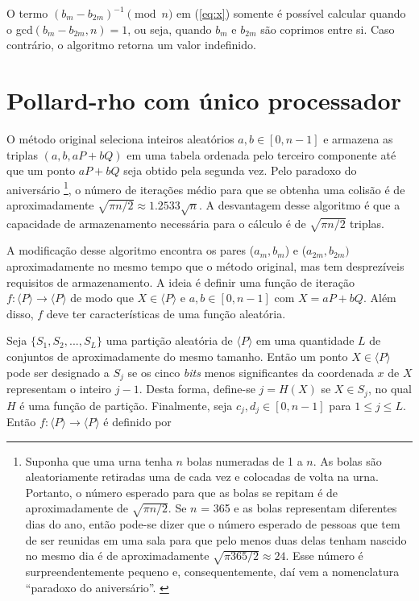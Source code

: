 O termo $(b_m - b_{2m})^{-1} \pmod n$ em (\ref{eq:x}) somente é possível calcular quando o gcd$(b_m - b_{2m}, n) = 1$, ou seja, quando \(b_m\) e \(b_{2m}\) são coprimos entre si. Caso contrário, o algoritmo retorna um valor indefinido.

%
%
\section{Pollard-rho com único processador} \label{sec:single}
O método original seleciona inteiros aleatórios $a, b \in [0, n-1]$ e armazena as triplas $(a, b, aP + bQ)$ em uma tabela ordenada pelo terceiro componente até que um ponto $aP + bQ$ seja obtido pela segunda vez. Pelo paradoxo do aniversário
\footnote{Suponha que uma urna tenha \(n\) bolas numeradas de 1 a \(n\). As bolas são aleatoriamente retiradas uma de cada vez e colocadas de volta na urna. Portanto, o número esperado para que as bolas se repitam é de aproximadamente de $\sqrt{\pi n/2}$. Se \(n\) = 365 e as bolas representam diferentes dias do ano, então pode-se dizer que o número esperado de pessoas que tem de ser reunidas em uma sala para que pelo menos duas delas tenham nascido no mesmo dia é de aproximadamente $\sqrt{\pi 365/2} \approx 24$. Esse número é surpreendentemente pequeno e, consequentemente, daí vem a nomenclatura ``paradoxo do aniversário''. \cite{Guide}},
o número de iterações médio para que se obtenha uma colisão é de aproximadamente $\sqrt{\pi n/2} \approx 1.2533 \sqrt{n}$. A desvantagem desse algoritmo é que a capacidade de armazenamento necessária para o cálculo é de $\sqrt{\pi n/2}$ triplas.

A modificação desse algoritmo encontra os pares ($a_m, b_m$) e ($a_{2m}, b_{2m})$ aproximadamente no mesmo tempo que o método original, mas tem desprezíveis requisitos de armazenamento. A ideia é definir uma função de iteração $f : \langle P \rangle \to \langle P \rangle$ de modo que $X \in \langle P \rangle$ e $a, b \in [0, n-1]$ com $X = aP + bQ$. Além disso, \(f\) deve ter características de uma função aleatória.

Seja $\{S_1, S_2, ..., S_L\}$ uma partição aleatória de $\langle P \rangle$ em uma quantidade \(L\) de conjuntos de aproximadamente do mesmo tamanho. Então um ponto $X \in \langle P \rangle$ pode ser designado a \(S_j\) se os cinco \textit{bits} menos significantes da coordenada \(x\) de \(X\) representam o inteiro \(j-1\). Desta forma, define-se $j = H(X)$ se $X \in S_j$, no qual \(H\) é uma função de partição. Finalmente, seja $c_j, d_j \in [0, n-1]$ para $1 \leq j \leq L$. Então $f : \langle P \rangle \to  \langle P \rangle$ é definido por


